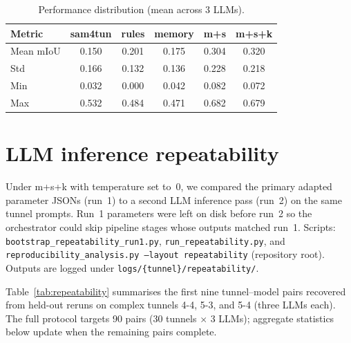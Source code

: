 \begin{table}[ht]
\caption{Performance distribution (mean across 3 LLMs).}\label{tab:distribution}
\begin{tabular*}{\tblwidth}{@{} l c c c c c @{}}
\toprule
Metric & sam4tun & rules & memory & m+s & m+s+k \\
\midrule
Mean mIoU & 0.150 & 0.201 & 0.175 & 0.304 & 0.320 \\
Std & 0.166 & 0.132 & 0.136 & 0.228 & 0.218 \\
Min & 0.032 & 0.000 & 0.042 & 0.082 & 0.072 \\
Max & 0.532 & 0.484 & 0.471 & 0.682 & 0.679 \\
\bottomrule
\end{tabular*}
\end{table}

\section{LLM inference repeatability}\label{app:repeatability}

Under m+s+k with temperature set to~0, we compared the primary adapted parameter JSONs (run~1) to a second LLM inference pass (run~2) on the same tunnel prompts. Run~1 parameters were left on disk before run~2 so the orchestrator could skip pipeline stages whose outputs matched run~1. Scripts: \texttt{bootstrap\_repeatability\_run1.py}, \texttt{run\_repeatability.py}, and \texttt{reproducibility\_analysis.py --layout repeatability} (repository root). Outputs are logged under \texttt{logs/\{tunnel\}/repeatability/}.

Table~\ref{tab:repeatability} summarises the first nine tunnel--model pairs recovered from held-out reruns on complex tunnels 4-4, 5-3, and 5-4 (three LLMs each). The full protocol targets 90 pairs (30 tunnels $\times$ 3 LLMs); aggregate statistics below update when the remaining pairs complete.

